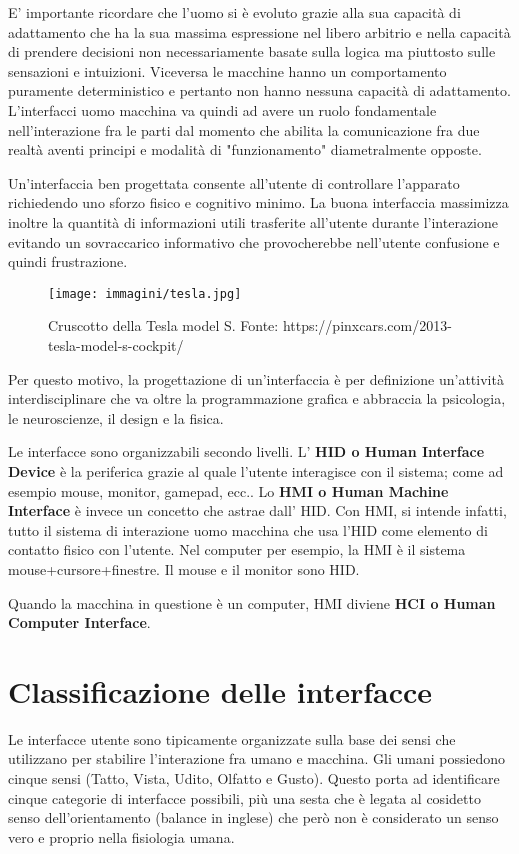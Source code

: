 E' importante ricordare che l'uomo si è evoluto grazie alla sua capacità di adattamento che ha la sua massima espressione nel libero arbitrio e nella capacità di prendere decisioni non necessariamente basate sulla logica ma piuttosto sulle sensazioni e intuizioni. Viceversa le macchine hanno un comportamento puramente deterministico e pertanto non hanno nessuna capacità di adattamento. L'interfacci uomo macchina va quindi ad avere un ruolo fondamentale nell'interazione fra le parti dal momento che abilita la comunicazione fra due realtà aventi principi e modalità di "funzionamento" diametralmente opposte.

Un'interfaccia ben progettata consente all'utente di controllare l'apparato richiedendo uno sforzo fisico e cognitivo minimo. La buona interfaccia massimizza inoltre la quantità di informazioni utili trasferite all'utente durante l'interazione evitando un sovraccarico informativo che provocherebbe nell'utente confusione e quindi frustrazione.

\begin{figure}[!h]
	\centering
	\texttt{[image: immagini/tesla.jpg]}
	\caption{Cruscotto della Tesla model S. Fonte: 
https://pinxcars.com/2013-tesla-model-s-cockpit/}
\end{figure}

Per questo motivo, la progettazione di un'interfaccia è per definizione un'attività interdisciplinare che va oltre la programmazione grafica e abbraccia la psicologia, le neuroscienze, il design e la fisica.

Le interfacce sono organizzabili secondo livelli. L' \textbf{HID o Human Interface Device} è la periferica grazie al quale l'utente interagisce con il sistema; come ad esempio mouse, monitor, gamepad, ecc.. Lo \textbf{HMI o Human Machine Interface} è invece un concetto che astrae dall' HID. Con HMI, si intende infatti, tutto il sistema di interazione uomo macchina che usa l'HID come elemento di contatto fisico con l'utente. Nel computer per esempio, la HMI è il sistema mouse+cursore+finestre. Il mouse e il monitor sono HID.

Quando la macchina in questione è un computer, HMI diviene \textbf{HCI o Human Computer Interface}.

\section{Classificazione delle interfacce}
Le interfacce utente sono tipicamente organizzate sulla base dei sensi che utilizzano per stabilire l'interazione fra umano e macchina. Gli umani possiedono cinque sensi (Tatto, Vista, Udito, Olfatto e Gusto). Questo porta ad identificare cinque categorie di interfacce possibili, più una sesta che è legata al cosidetto senso dell'orientamento (balance in inglese) che però non è considerato un senso vero e proprio nella fisiologia umana.

